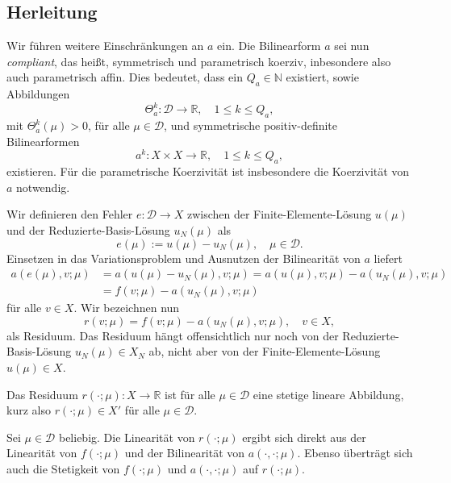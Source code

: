 \subsection{Herleitung} %
\label{sub:herleitung}

Wir führen weitere Einschränkungen an $a$ ein.
Die Bilinearform $a$ sei nun \emph{compliant}, das heißt, symmetrisch und parametrisch koerziv, inbesondere also auch parametrisch affin.
Dies bedeutet, dass ein $Q_a \in \mathbb{N}$ existiert, sowie Abbildungen
\begin{equation}
    \Theta_a^k \colon \mathcal D \to \mathbb{R}, \quad 1 \leq k \leq Q_a,
\end{equation}
mit $\Theta_a^k(\mu) > 0$, für alle $\mu \in \mathcal D$, und symmetrische positiv-definite Bilinearformen
\begin{equation}
    a^k \colon X \times X \to \mathbb{R}, \quad 1 \leq k \leq Q_a,
\end{equation}
existieren.
Für die parametrische Koerzivität ist insbesondere die Koerzivität von $a$ notwendig.

Wir definieren den Fehler $e \colon \mathcal D \to X$ zwischen der Finite-Elemente-Lösung $u(\mu)$ und der Reduzierte-Basis-Lösung $u_N(\mu)$ als
\begin{equation}
    \label{eq:fehler_fe_und_rb_lsg}
    e(\mu) := u(\mu) - u_N(\mu), \quad \mu \in \mathcal D.
\end{equation}
Einsetzen in das Variationsproblem und Ausnutzen der Bilinearität von $a$ liefert
\begin{align}
    a(e(\mu), v; \mu)
    &= a(u(\mu) - u_N(\mu), v; \mu)
    = a(u(\mu), v; \mu) - a(u_N(\mu), v; \mu) \\
    &= f(v; \mu) - a(u_N(\mu), v; \mu)
\end{align}
für alle $v \in X$.
Wir bezeichnen nun
\begin{equation}
    \label{eq:def_residuum}
    r(v; \mu) = f(v; \mu) - a(u_N(\mu), v; \mu), \quad v \in X,
\end{equation}
als Residuum.
Das Residuum hängt offensichtlich nur noch von der Reduzierte-Basis-Lösung $u_N(\mu) \in X_N$ ab, nicht aber von der Finite-Elemente-Lösung $u(\mu) \in X$.

\begin{Lemma}
    Das Residuum $r(\cdot; \mu) \colon X \to \mathbb{R}$ ist für alle $\mu \in \mathcal D$ eine stetige lineare Abbildung, kurz also $r(\cdot; \mu) \in X'$ für alle $\mu \in \mathcal D$.

    \begin{Beweis}
    Sei $\mu \in \mathcal D$ beliebig.
    Die Linearität von $r(\cdot; \mu)$ ergibt sich direkt aus der Linearität von $f(\cdot; \mu)$ und der Bilinearität von $a(\cdot, \cdot; \mu)$.
    Ebenso überträgt sich auch die Stetigkeit von $f(\cdot; \mu)$ und $a(\cdot, \cdot; \mu)$ auf $r(\cdot; \mu)$.
    \end{Beweis}
\end{Lemma}

